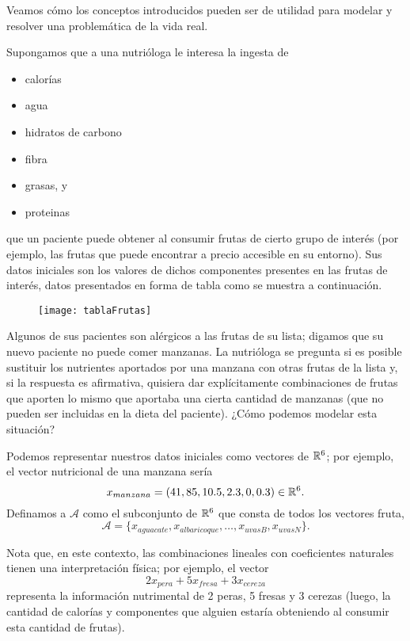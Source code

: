 Veamos cómo los conceptos introducidos pueden ser de utilidad
para modelar y resolver una problemática de la vida real.

Supongamos que a una nutrióloga le interesa
la ingesta de 
\begin{itemize}
	\item calorías
	\item agua
	\item hidratos de carbono 
	\item fibra
	\item grasas, y 
	\item proteinas
\end{itemize}
que un paciente puede obtener al consumir frutas de cierto
grupo de interés (por ejemplo, las frutas que puede encontrar
a precio accesible en su entorno). Sus datos iniciales son
los valores de dichos componentes presentes en las frutas
de interés, datos presentados en forma de tabla como
se muestra a continuación.

\begin{figure}[H]
	\centering
	\texttt{[image: tablaFrutas]} 
\end{figure}	

Algunos de sus pacientes son alérgicos a las frutas de
su lista; digamos que su nuevo paciente no puede 
comer manzanas. La nutrióloga se pregunta si es posible
sustituir los nutrientes aportados por una manzana
con otras frutas de la lista y, si la respuesta es afirmativa,
quisiera dar explícitamente combinaciones de frutas que 
aporten lo mismo que aportaba una cierta cantidad de manzanas
(que no pueden ser incluidas en la dieta del paciente). 
¿Cómo podemos modelar esta situación?

Podemos representar nuestros datos iniciales como
vectores de $\mathbb{R}^{6}$; por ejemplo, el vector
nutricional de una manzana sería
\[
x_{manzana} = (41, 85, 10.5, 2.3, 0, 0.3)
\in \mathbb{R}^{6}.
\]
Definamos a $\mathcal{A}$ como el subconjunto de $\mathbb{R}^{6}$
que consta de todos los vectores fruta,
\[
\mathcal{A} = \{ x_{aguacate}, x_{albaricoque}, \ldots , x_{uvasB},
x_{uvasN} \}.
\]

Nota que, en este contexto, las combinaciones lineales
con coeficientes naturales tienen una interpretación física; por
ejemplo, el vector
\[
2x_{pera} + 5 x_{fresa} + 3 x_{cereza}
\]
representa la información nutrimental de 2 peras,
5 fresas y 3 cerezas (luego, la cantidad de calorías y componentes
que alguien estaría obteniendo al consumir esta cantidad de frutas).

